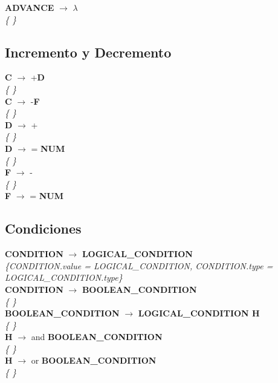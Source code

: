 \documentclass[10pt,a4paper]{article}
\begin{document}
\textbf{ADVANCE} $\rightarrow$ $\lambda$ \\
\textit{\{   \}} \\

\subsection{Incremento y Decremento}
\textbf{C} $\rightarrow$ +\textbf{D} \\ 
\textit{\{   \}} \\

\textbf{C} $\rightarrow$ -\textbf{F} \\
\textit{\{   \}} \\

\textbf{D} $\rightarrow$ +   \\
\textit{\{   \}} \\

\textbf{D} $\rightarrow$ = \textbf{NUM} \\
\textit{\{   \}} \\

\textbf{F} $\rightarrow$ - \\
\textit{\{   \}} \\

\textbf{F} $\rightarrow$ = \textbf{NUM} \\

\subsection{Condiciones}
\textbf{CONDITION} $\rightarrow$ \textbf{LOGICAL\_CONDITION}   \\
\textit{\{CONDITION.value = LOGICAL\_CONDITION,  CONDITION.type = LOGICAL\_CONDITION.type\}}\\

\textbf{CONDITION} $\rightarrow$ \textbf{BOOLEAN\_CONDITION} \\
\textit{\{   \}} \\

\textbf{BOOLEAN\_CONDITION} $\rightarrow$ \textbf{LOGICAL\_CONDITION H} \\
\textit{\{   \}} \\

\textbf{H} $\rightarrow$ and \textbf{BOOLEAN\_CONDITION} \\
\textit{\{   \}} \\

\textbf{H} $\rightarrow$ or \textbf{BOOLEAN\_CONDITION} \\
\textit{\{   \}} \\
\end{document}
